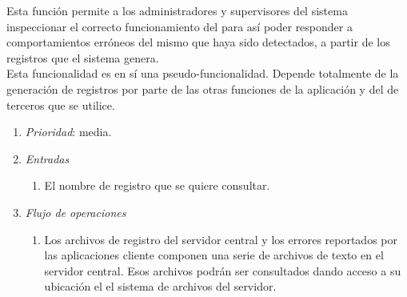 	Esta función permite a los administradores y supervisores del sistema inspeccionar el correcto funcionamiento del \software para así poder responder a comportamientos erróneos del mismo que haya sido detectados, a partir de los registros que el sistema genera.\\

	Esta funcionalidad es en sí una pseudo-funcionalidad. Depende totalmente de la generación de registros por parte de las otras funciones de la aplicación y del \software de terceros que se utilice.

\begin{enumerate}
	\item \textit{Prioridad}: media.
	\item \textit{Entradas}
	\begin{enumerate}
		\item El nombre de registro que se quiere consultar.
	\end{enumerate}
	\item \textit{Flujo de operaciones}
	\begin{enumerate}
		\item Los archivos de registro del servidor central y los errores reportados por las aplicaciones cliente componen una serie de archivos de texto en el servidor central. Esos archivos podrán ser consultados dando acceso a su ubicación el el sistema de archivos del servidor.
	\end{enumerate}
\end{enumerate}
